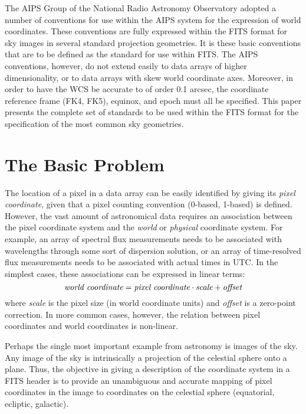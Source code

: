 The AIPS Group of the National Radio Astronomy Observatory adopted a number
of conventions for use within the AIPS system for the expression of world
coordinates.  These conventions are fully expressed within the FITS format
for sky images in several standard projection geometries.  It is these
basic conventions that are to be defined as the standard for use within
FITS.  The AIPS conventions, however, do not extend easily to data arrays
of higher dimensionality, or to data arrays with skew world coordinate
axes.  Moreover, in order to have the WCS be accurate to of order 0.1
arcsec, the coordinate reference frame (FK4, FK5), equinox, and epoch
must all be specified.  This paper presents the complete set of standards
to be used within the FITS format for the specification of the most 
common sky geometries.

\section{The Basic Problem}

The location of a pixel in a data array can be easily identified by giving
its {\it pixel coordinate}, given that a pixel counting convention (0-based,
1-based) is defined.  However, the vast amount of astronomical data requires
an association between the pixel coordinate system and the {\it world} or
{\it physical} coordinate system.  For example, an array of spectral flux
measurements needs to be associated with wavelengths through some sort of
dispersion solution, or an array of time-resolved flux measurements needs to 
be associated with actual times in UTC.  In the simplest cases, these
associations can be expressed in linear terms:
\begin{displaymath}
\hbox{\it world coordinate} = \hbox{\it pixel coordinate} \cdot \hbox{\it scale}
+ \hbox{\it offset}
\end{displaymath}
where {\it scale} is the pixel size (in world coordinate units) and {\it offset}
is a zero-point correction.  In more common cases, however, the relation 
between pixel coordinates and world coordinates is non-linear.  

Perhaps the single most important example from astronomy is images of the
sky. Any image of the sky is intrinsically a projection of the celestial sphere
onto a plane.  Thus, the objective in giving a description of the coordinate
system in a FITS header is to provide an unambiguous and accurate mapping of
pixel coordinates in the image to coordinates on the celestial sphere
(equatorial, ecliptic, galactic).

